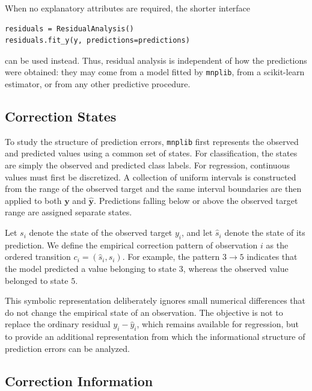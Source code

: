 When no explanatory attributes are required, the shorter interface

\begin{sourcecode}
{\scriptsize
\begin{verbatim}
residuals = ResidualAnalysis()
residuals.fit_y(y, predictions=predictions)
\end{verbatim}}
\end{sourcecode}

can be used instead. Thus, residual analysis is independent of how the predictions were obtained: they may come from a model fitted by \texttt{mnplib}, from a scikit-learn estimator, or from any other predictive procedure.


\subsection*{Correction States}

To study the structure of prediction errors, \texttt{mnplib} first represents the observed and predicted values using a common set of states. For classification, the states are simply the observed and predicted class labels. For regression, continuous values must first be discretized. A collection of uniform intervals is constructed from the range of the observed target and
the same interval boundaries are then applied to both $\mathbf y$ and $\widehat{\mathbf y}$. Predictions falling below or above the observed target range are assigned separate states.

Let $s_i$ denote the state of the observed target $y_i$, and let $\widehat s_i$ denote the state of its prediction. We define the empirical correction pattern of observation $i$ as the ordered transition $c_i = (\widehat s_i,s_i)$. For example, the pattern $3 \rightarrow 5$ indicates that the model predicted a value belonging to state $3$, whereas the observed value belonged to state $5$.

This symbolic representation deliberately ignores small numerical differences that do not change the empirical state of an observation. The objective is not to replace the ordinary residual $y_i-\widehat y_i$, which remains available for regression, but to provide an additional representation from which the informational structure of prediction errors can be analyzed.

\subsection*{Correction Information}

